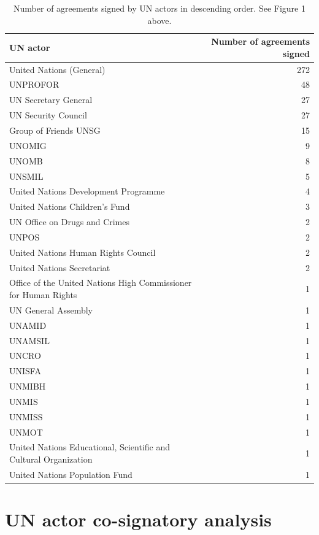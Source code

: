 \documentclass{article}
\begin{document}
\begin{table}[H]
\begin{center}
\small
\begin{tabularx}{\textwidth}{|X|r|}
    \hline
    \textbf{UN actor} & \textbf{Number of agreements signed} \\
    \hline
    \hline
United Nations (General) & 272 \\
\hline
UNPROFOR & 48 \\
\hline
UN Secretary General & 27 \\
\hline
UN Security Council & 27 \\
\hline
Group of Friends UNSG & 15 \\
\hline
UNOMIG & 9 \\
\hline
UNOMB & 8 \\
\hline
UNSMIL & 5 \\
\hline
United Nations Development Programme & 4 \\
\hline
United Nations Children's Fund & 3 \\
\hline
UN Office on Drugs and Crimes & 2 \\
\hline
UNPOS & 2 \\
\hline
United Nations Human Rights Council & 2 \\
\hline
United Nations Secretariat & 2 \\
\hline
Office of the United Nations High Commissioner for Human Rights & 1 \\
\hline
UN General Assembly & 1 \\
\hline
UNAMID & 1 \\
\hline
UNAMSIL & 1 \\
\hline
UNCRO & 1 \\
\hline
UNISFA & 1 \\
\hline
UNMIBH & 1 \\
\hline
UNMIS & 1 \\
\hline
UNMISS & 1 \\
\hline
UNMOT & 1 \\
\hline
United Nations Educational, Scientific and Cultural Organization & 1 \\
\hline
United Nations Population Fund & 1 \\
\hline
\end{tabularx}
\end{center}
\normalsize
\caption{Number of agreements signed by UN actors in descending order. See Figure 1 above.}
\end{table}

\section{UN actor co-signatory analysis}
\end{document}
